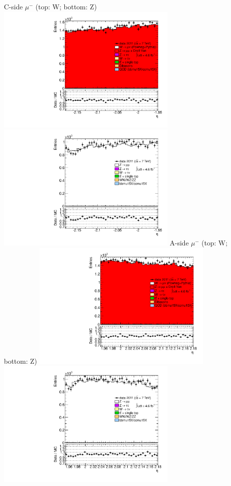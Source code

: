  {
\colb[T]
C-side $\mu^{-}$ (top: W; bottom: Z)
\centering
\includegraphics[width=0.66\textwidth]{dates/20130306/figures/etaphi/Wzlike_10_C_stack_l_eta_NEG} \\
\includegraphics[width=0.66\textwidth]{dates/20130306/figures/etaphi/Z_10_C_stack_lN_eta_ALL.pdf}
A-side $\mu^{-}$ (top: W; bottom: Z)
\centering
\includegraphics[width=0.66\textwidth]{dates/20130306/figures/etaphi/Wzlike_10_A_stack_l_eta_NEG} \\
\includegraphics[width=0.66\textwidth]{dates/20130306/figures/etaphi/Z_10_A_stack_lN_eta_ALL.pdf} 
\cole
}

